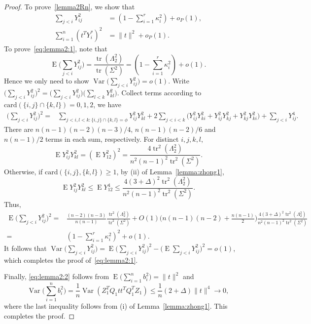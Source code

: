 \documentclass[3p]{elsarticle}
\DeclareMathOperator{\mytr}{tr}
\DeclareMathOperator{\myE}{E}
\DeclareMathOperator{\myVar}{Var}
\theoremstyle{plain}
\theoremstyle{definition}
\theoremstyle{remark}
\begin{document}
\begin{proof}
To prove~\eqref{lemma2Rn}, we show that
\begin{align}
    \sum_{j<i} Y_{ij}^2&= (1-\sum_{i=1}^r \kappa_i^2)+o_P(1),
    \label{eq:lemma2:1}
    \\
    \sum_{i=1}^n (t^T Y_i^*)^2&=\|t\|^2 +o_P(1).
    \label{eq:lemma2:2}
\end{align}
To prove~\eqref{eq:lemma2:1}, note that
$$
    \myE \big(\sum_{j<i} Y_{ij}^2\big)= \frac{\mytr(\Lambda_2^2)}{\mytr(\Sigma^2)}=(1-\sum_{i=1}^r \kappa_i^2)+o(1).
$$
    Hence we only need to show $\myVar\big(\sum_{j<i} Y_{ij}^2)=o(1)$. 
    Write $\big(\sum_{j<i}Y_{ij}^2\big)^2=
        \big(\sum_{j<i}Y_{ij}^2\big)
        \big(\sum_{l<k}Y_{kl}^2\big)$.
    Collect terms according to $\mathrm{card}(\{i,j\}\cap\{k,l\})=0,1,2$, we have
    \begin{equation*}%
    \begin{aligned}
        \big(\sum_{j<i}Y_{ij}^2\big)^2
        =&
        \sum_{j<i,l<k:\{i,j\}\cap \{k,l\}=\phi}Y_{ij}^2 Y_{kl}^2
        +2\sum_{j<i<k}\Big(
        Y_{ij}^2 Y_{ki}^2+
        Y_{ij}^2 Y_{kj}^2
        +
        Y_{kj}^2 Y_{ki}^2
        \Big)
         +
        \sum_{j<i}Y_{ij}^4.
    \end{aligned}
    \end{equation*}
    There are  $n(n-1)(n-2)(n-3)/4$, $n(n-1)(n-2)/6$ and $n(n-1)/2$ terms in each sum, respectively.
    For distinct $i,j,k,l$, 
    $$\myE Y_{ij}^2 Y_{kl}^2=(\myE Y_{12}^2)^2=\frac{4\mytr^2(\Lambda_2^2)}{n^2(n-1)^2\mytr^2(\Sigma^2)}.$$
    Otherwise, if $\text{card}(\{i,j\},\{k,l\})\geq 1$, by (ii) of Lemma~\ref{lemma:zhong1},
    $$\myE Y_{ij}^2 Y_{kl}^2\leq \myE Y_{12}^4\leq \frac{4(3+\Delta)^2\mytr^2(\Lambda_2^2)}{n^2(n-1)^2\mytr^2(\Sigma^2)}.$$
    Thus,
    \begin{equation*}
    \begin{aligned}
        \myE\big(\sum_{j<i}Y_{ij}^2\big)^2
            =& \frac{(n-2)(n-3)}{n(n-1)}\frac{\mytr^2 (\Lambda_2^2)}{\mytr^2(\Sigma^2)}
            +
            O(1)\big(n(n-1)(n-2)+\frac{n(n-1)}{2}\big)\frac{4(3+\Delta)^2\mytr^2(\Lambda_2^2)}{n^2(n-1)^2\mytr^2(\Sigma^2)}\\
            =& (1-\sum_{i=1}^r \kappa_i^2)^2+o(1).
    \end{aligned}
    \end{equation*}
    It follows that
    $
    \myVar\big(\sum_{j<i}Y_{ij}^2\big)=
    \myE\big(\sum_{j<i}Y_{ij}^2\big)^2-
    \big(\myE\sum_{j<i}Y_{ij}^2\big)^2=o(1)
    $, which completes the proof of~\eqref{eq:lemma2:1}.


    Finally, \eqref{eq:lemma2:2} follows from
$
\myE \big(\sum_{i=1}^n b_i^2\big)=\|t\|^2
$
and
$$
\myVar \big(\sum_{i=1}^n b_i^2 \big)=\frac{1}{n}\myVar (Z_1^T Q_1 t t^T Q_1^T Z_1)
\leq \frac{1}{n}(2+\Delta)\|t\|^4\to 0,
$$
where the last inequality follows from (i) of Lemma~\ref{lemma:zhong1}.
This completes the proof.


\end{proof}
\end{document}
